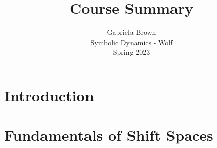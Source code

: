 \documentclass[11pt, reqno]{amsart}
\title{Course Summary}
\author{Gabriela Brown\\ Symbolic Dynamics - Wolf \\ Spring 2023}
\theoremstyle{plain}
\numberwithin{thm}{subsection}
\theoremstyle{definition}
\begin{document}
\maketitle

 {
  \setlength{\parskip}{4.4pt}   
  \tableofcontents
 }


\section{Introduction}




\newpage
\section{Fundamentals of Shift Spaces}







\end{document}
